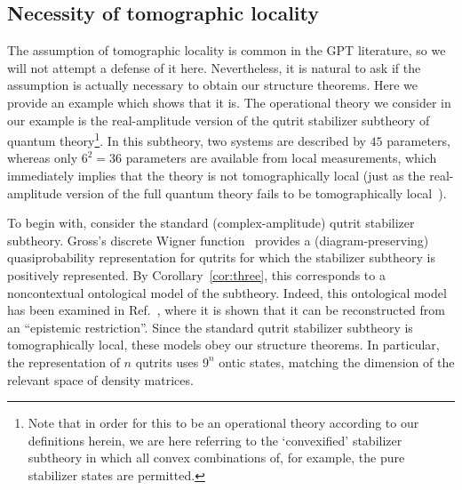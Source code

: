 \documentclass[10pt,twocolumn,aps,groupedaddress,nofootinbib]{revtex4}
\newcommand{\rob}{\color{cyan}}
\newcommand{\blk}{\color{black}}
\begin{document}
\subsection{Necessity of tomographic locality} \label{neclt}
The assumption of tomographic locality is common in the GPT literature, so we will not attempt a defense of it here. Nevertheless, it is natural to ask if the assumption is actually necessary to obtain our structure theorems. Here we provide an example which shows that it is. The operational theory we consider in our example is the real-amplitude version of the qutrit stabilizer subtheory of quantum theory\footnote{Note that in order for this to be an operational theory according to our definitions herein, we are here referring to the `convexified' stabilizer subtheory in which all convex combinations of, for example, the pure stabilizer states are permitted.}. In this subtheory, two systems are described by $45$ parameters, whereas only $6^2 = 36$ parameters are available from local measurements, which immediately implies that the theory is not tomographically local (just as the real-amplitude version of the full quantum theory fails to be tomographically local~\cite{hardy2012limited}).

To begin with, consider the standard (complex-amplitude) qutrit stabilizer subtheory. Gross's discrete Wigner function~\cite{gross2006} 
provides a (diagram-preserving) quasiprobability representation for qutrits for which the stabilizer subtheory is positively represented.  By Corollary~\ref{cor:three}, this corresponds to a noncontextual ontological model of the subtheory. 
Indeed, this ontological model has been examined in Ref.~\cite{epistricted}, where it is shown that it can be reconstructed from an ``epistemic restriction''. Since the standard qutrit stabilizer subtheory is tomographically local, these models obey our structure theorems. In particular, the representation of $n$ qutrits uses $9^n$ ontic states, matching the dimension of the relevant space of density matrices.
\end{document}
